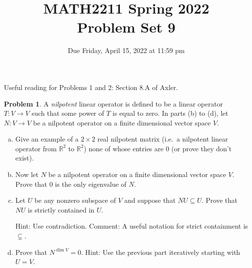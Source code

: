 \documentclass[11pt,oneside]{amsart}
\title{MATH2211 Spring 2022\\
Problem Set 9}
\author{Due Friday, April 15, 2022 at 11:59 pm}
\theoremstyle{definition}
\newtheorem{problem}{Problem}
\newcommand{\bR}{\mathbb{R}}
\begin{document}
    \maketitle

    Useful reading for Problems 1 and 2: Section 8.A of Axler.

    \begin{problem}
        A \emph{nilpotent} linear operator is defined to be a linear operator $T\colon V\to V$ such that some power of $T$ is equal to zero. In parts (b) to (d), let $N\colon V\to V$ be a nilpotent operator on a finite dimensional vector space $V$.
        \begin{enumerate}[(a)]
            \item Give an example of a $2\times 2$ real nilpotent matrix (i.e.\ a nilpotent linear operator from $\bR^2$ to $\bR^2$) none of whose entries are 0 (or prove they don't exist).
            \item Now let $N$ be a nilpotent operator on a finite dimensional vector space $V$. Prove that 0 is the only eigenvalue of $N$.
            \item Let $U$ be any nonzero subspace of $V$ and suppose that $NU\subseteq U$. Prove that $NU$ is strictly contained in $U$.
            
            Hint: Use contradiction. Comment: A useful notation for strict containment is $\subsetneq$.
            \item Prove that $N^{\dim V}=0$. Hint: Use the previous part iteratively starting with $U=V$.
        \end{enumerate}
    \end{problem}
    
\end{document}
